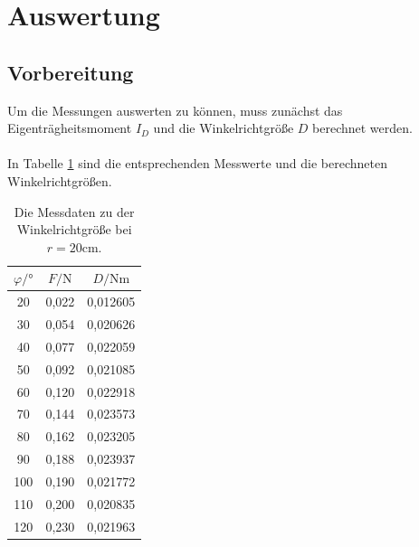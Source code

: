 \section{Auswertung}
\label{sec:Auswertung}

\subsection{Vorbereitung}\label{subsec:Vorbereitung}
Um die Messungen auswerten zu können, muss zunächst das Eigenträgheitsmoment $I_{D}$ und die Winkelrichtgröße $D$ berechnet werden.\\
\\

In Tabelle \ref{tab:Winkelrichtgröße} sind die entsprechenden Messwerte und die berechneten Winkelrichtgrößen.

\begin{table}
\centering
\caption{Die Messdaten zu der Winkelrichtgröße bei $r = 20 \unit{\centi\meter}$.}
\label{tab:Winkelrichtgröße}
\begin{tabular}{c c c}
  \toprule
  $\varphi / °$  &  $F / \unit\newton$ & $D / \unit{\newton\meter}$ \\
  \midrule
              20 &        0,022 &     0,012605 \\
              30 &        0,054 &     0,020626 \\
              40 &        0,077 &     0,022059 \\
              50 &        0,092 &     0,021085 \\
              60 &        0,120 &     0,022918 \\
              70 &        0,144 &     0,023573 \\
              80 &        0,162 &     0,023205 \\
              90 &        0,188 &     0,023937 \\
             100 &        0,190 &     0,021772 \\
             110 &        0,200 &     0,020835 \\
             120 &        0,230 &     0,021963 \\
  \bottomrule
\end{tabular}
\end{table}

